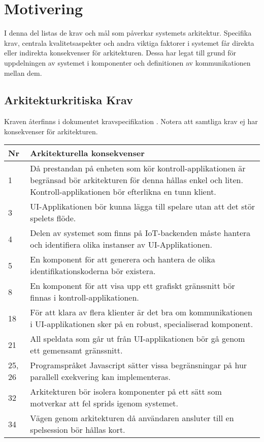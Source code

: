\section{Motivering}
I denna del listas de krav och mål som påverkar systemets arkitektur. Specifika krav, centrala kvalitetsaspekter och andra viktiga faktorer i systemet får direkta eller indirekta konsekvenser för arkitekturen. Dessa har legat till grund för uppdelningen av systemet i komponenter och definitionen av kommunikationen mellan dem.

\subsection{Arkitekturkritiska Krav}
Kraven återfinns i dokumentet kravspecifikation \cite{bib-kravspec}. Notera att samtliga krav ej har konsekvenser för arkitekturen.\\

\begin{center}
    \begin{tabular}{|p{1cm}|p{13cm}|}
        \hline
        \textbf{Nr} & \textbf{Arkitekturella konsekvenser}\\
        \hline
        1 & Då prestandan på enheten som kör kontroll-applikationen är begränsad bör arkitekturen för denna hållas enkel och liten. Kontroll-applikationen bör efterlikna en tunn klient.\\
        \hline
        3 & UI-Applikationen bör kunna lägga till spelare utan att det stör spelets flöde.\\
        \hline
        4 & Delen av systemet som finns på IoT-backenden måste hantera och identifiera olika instanser av UI-Applikationen.\\
        \hline
        5 & En komponent för att generera och hantera de olika identifikationskoderna bör existera.\\
        \hline
        8 & En komponent för att visa upp ett grafiskt gränssnitt bör finnas i kontroll-applikationen.\\
        \hline
        18 & För att klara av flera klienter är det bra om kommunikationen i UI-applikationen sker på en robust, specialiserad komponent.\\
        \hline
        21 & All speldata som går ut från UI-applikationen bör gå genom ett gemensamt gränssnitt.\\
        \hline
        25, 26 & Programspråket Javascript sätter vissa begränsningar på hur parallell exekvering kan implementeras.\\
        \hline
        32 & Arkitekturen bör isolera komponenter på ett sätt som motverkar att fel sprids igenom systemet.\\
        \hline
        34 & Vägen genom arkitekturen då användaren ansluter till en spelsession bör hållas kort.\\
        \hline
    \end{tabular}
\end{center}

